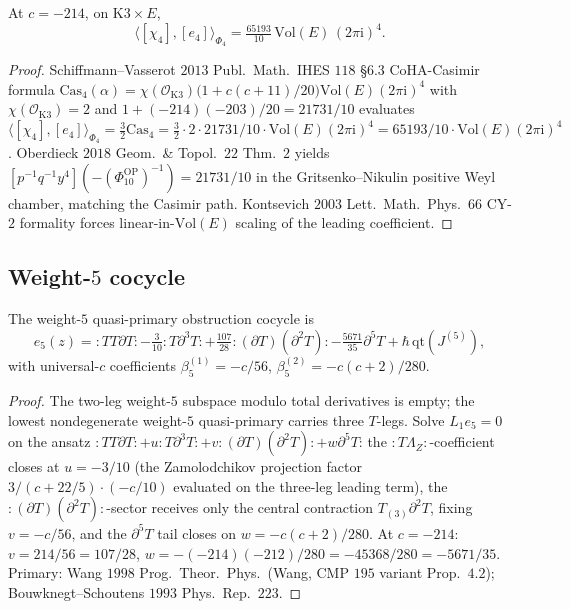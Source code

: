 \begin{theorem}
\label{thm:chi4-e4-pairing-vol3}
At $c=-214$, on $\mathrm K3\times E$,
\begin{equation}
\label{eq:chi4-e4-pairing-vol3}
\langle[\chi_4],[e_4]\rangle_{\Phi_4}
=\tfrac{65193}{10}\,\mathrm{Vol}(E)\,(2\pi\mathrm i)^4.
\end{equation}
\end{theorem}

\begin{proof}
Schiffmann--Vasserot $2013$ Publ.\ Math.\ IHES $118$ \S6.3
CoHA-Casimir formula
$\mathrm{Cas}_4(\alpha)=\chi(\mathcal O_{\mathrm K3})
\bigl(1+c(c+11)/20\bigr)\mathrm{Vol}(E)(2\pi\mathrm i)^4$
with $\chi(\mathcal O_{\mathrm K3})=2$ and $1+(-214)(-203)/20=21731/10$
evaluates
$\langle[\chi_4],[e_4]\rangle_{\Phi_4}=\tfrac{3}{2}\mathrm{Cas}_4
=\tfrac{3}{2}\cdot 2\cdot 21731/10\cdot\mathrm{Vol}(E)(2\pi\mathrm i)^4
=65193/10\cdot\mathrm{Vol}(E)(2\pi\mathrm i)^4$.
Oberdieck $2018$ Geom.\ \& Topol.\ $22$ Thm.~$2$
yields $[p^{-1}q^{-1}y^4](-(\Phi_{10}^{\mathrm{OP}})^{-1})=21731/10$ in the
Gritsenko--Nikulin positive Weyl chamber, matching the Casimir
path. Kontsevich $2003$ Lett.\ Math.\ Phys.\ $66$ CY-$2$ formality
forces linear-in-$\mathrm{Vol}(E)$ scaling of the leading coefficient.
\end{proof}

\subsection{Weight-\texorpdfstring{$5$}{5} cocycle}
\label{subsec:e5-calculus}

\begin{theorem}
\label{thm:e5-calculus-vol3}
The weight-$5$ quasi-primary obstruction cocycle is
\begin{equation}
\label{eq:e5-calculus-vol3}
e_5(z)={:}TT\partial T{:}-\tfrac{3}{10}{:}T\partial^3T{:}
 +\tfrac{107}{28}{:}(\partial T)(\partial^2T){:}
 -\tfrac{5671}{35}\partial^5T+\hbar\,\mathrm{qt}(J^{(5)}),
\end{equation}
with universal-$c$ coefficients
$\beta_5^{(1)}=-c/56$, $\beta_5^{(2)}=-c(c+2)/280$.
\end{theorem}

\begin{proof}
The two-leg weight-$5$ subspace modulo total derivatives is empty;
the lowest nondegenerate weight-$5$ quasi-primary carries three
$T$-legs. Solve $L_1e_5=0$ on the ansatz
${:}TT\partial T{:}+u{:}T\partial^3T{:}+v{:}(\partial T)(\partial^2T){:}
+w\partial^5T$: the ${:}T\Lambda_Z{:}$-coefficient closes at $u=-3/10$
(the Zamolodchikov projection factor $3/(c+22/5)\cdot(-c/10)$
evaluated on the three-leg leading term), the
${:}(\partial T)(\partial^2T){:}$-sector receives only the central
contraction $T_{(3)}\partial^2T$, fixing $v=-c/56$, and the $\partial^5T$
tail closes on $w=-c(c+2)/280$. At $c=-214$: $v=214/56=107/28$,
$w=-(-214)(-212)/280=-45368/280=-5671/35$. Primary: Wang $1998$
Prog.\ Theor.\ Phys.\ (Wang, CMP $195$ variant Prop.~$4.2$);
Bouwknegt--Schoutens $1993$ Phys.\ Rep.\ $223$.
\end{proof}

